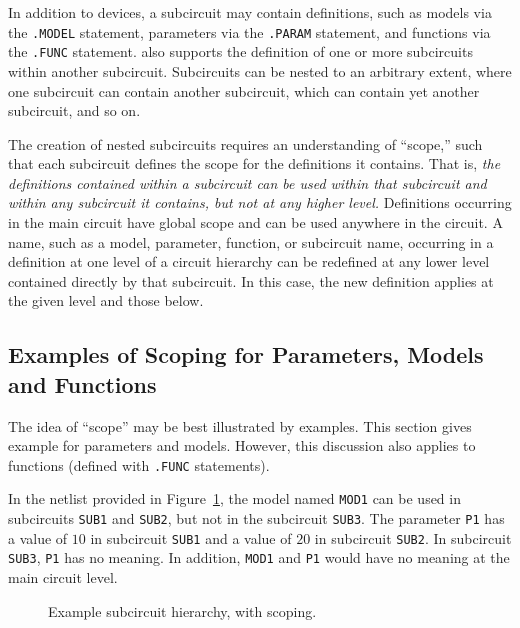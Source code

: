 In addition to devices, a subcircuit may contain definitions, such as models
via the \texttt{.MODEL} statement, parameters via the \texttt{.PARAM}
statement, and functions via the \texttt{.FUNC} statement.  \Xyce{} also
supports the definition of one or more subcircuits within another subcircuit.
 Subcircuits can be nested to an arbitrary extent,
where one subcircuit can contain another subcircuit, which can contain yet
another subcircuit, and so on.

The creation of nested subcircuits requires an understanding of ``scope,''
 such that each subcircuit defines the scope for the
definitions it contains.  That is, {\em the definitions contained within a
subcircuit can be used within that subcircuit and within any subcircuit it
contains, but not at any higher level.}  Definitions occurring in the main
circuit have global scope and can be used anywhere in the circuit.  A name,
such as a model, parameter, function, or subcircuit name, occurring in a
definition at one level of a circuit hierarchy can be redefined at any lower
level contained directly by that subcircuit.  In this case, the new definition
applies at the given level and those below.

\subsection{Examples of Scoping for Parameters, Models and Functions}
The idea of ``scope'' may be best illustrated by examples.  This section gives
example for parameters and models.  However, this discussion also applies to
functions (defined with \texttt{.FUNC} statements). 

In the netlist provided
in Figure~\ref{Subcircuit_Example_2}, the model named \texttt{MOD1} can be used
in subcircuits \texttt{SUB1} and \texttt{SUB2}, but not in the subcircuit
\texttt{SUB3}. The parameter \texttt{P1} has a value of $10$ in subcircuit
\texttt{SUB1} and a value of $20$ in subcircuit \texttt{SUB2}. In subcircuit
\texttt{SUB3}, \texttt{P1} has no meaning.  In addition, \texttt{MOD1}
and \texttt{P1} would have no meaning at the main circuit level.

\begin{figure}[H]
\begin{centering}
\caption{Example subcircuit hierarchy, with scoping.\label{Subcircuit_Example_2}}
\end{centering}
\end{figure}


